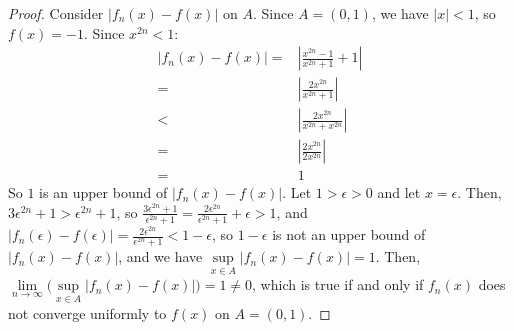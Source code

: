\documentclass{article}
\newcommand{\eps}{\ensuremath{\epsilon}}
\newcommand{\limxy}[2]{\ensuremath{\underset{#1 \to #2 }{\lim}}}
\begin{document}
\begin{proof}
	Consider $|f_n(x) - f(x)|$ on $A$.
	Since $A = (0,1)$, we have $|x| < 1$,
	so $f(x) = -1$.
	Since $x^{2n} < 1$:
	\begin{align}
		|f_n(x) - f(x)| = & |\frac{x^{2n} - 1}{x^{2n} + 1} + 1| \\
		= & |\frac{2x^{2n}}{x^{2n} + 1}| \\
		< & |\frac{2x^{2n}}{x^{2n} + x^{2n}}| \\
		= & |\frac{2x^{2n}}{2x^{2n}}| \\
		= & 1
	\end{align}
	So $1$ is an upper bound of $|f_n(x) - f(x)|$.
	Let $1 > \eps > 0$ and let $x = \eps$.
	Then, $3\eps^{2n} + 1 > \eps^{2n} + 1$,
	so $\frac{3\eps^{2n} + 1}{\eps^{2n} + 1} = \frac{2\eps^{2n}}{\eps^{2n} + 1} + \eps > 1$,
	and $|f_n(\eps) - f(\eps)| = \frac{2\eps^{2n}}{\eps^{2n} + 1} < 1 - \eps$,
	so $1 - \eps$ is not an upper bound of $|f_n(x) - f(x)|$,
	and we have $\underset{x \in A}{\sup}|f_n(x) - f(x)| = 1$.
	Then, $\limxy{n}{\infty}\Big(\underset{x \in A}{\sup}|f_n(x) - f(x)|\Big) = 1 \neq 0$,
	which is true if and only if
	$f_n(x)$ does not converge uniformly to $f(x)$ on $A = (0,1)$.
\end{proof}
\end{document}
